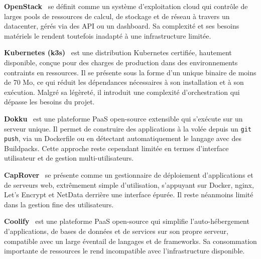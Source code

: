 \documentclass{rapportClass} %
\begin{document}
\textbf{OpenStack}~\cite{openstack} se définit comme un système d'exploitation
cloud qui contrôle de larges pools de ressources de calcul, de stockage et de
réseau à travers un datacenter, gérés via des API ou un dashboard. %
Sa complexité et ses besoins matériels le rendent toutefois inadapté à une
infrastructure limitée.
\smallskip

\textbf{Kubernetes (k3s)}~\cite{k3s} est une distribution Kubernetes certifiée,
hautement disponible, conçue pour des charges de production dans des environnements
contraints en ressources. Il se présente sous la forme d'un unique binaire de moins de 70 Mo,
ce qui réduit les dépendances nécessaires à son installation et à son exécution.
Malgré sa légèreté, il introduit une complexité d'orchestration qui dépasse les
besoins du projet.
\smallskip

\textbf{Dokku}~\cite{dokku} est une plateforme PaaS open-source extensible
qui s'exécute sur un serveur unique. Il permet de construire des applications
à la volée depuis un \texttt{git push}, via un Dockerfile ou en détectant
automatiquement le langage avec des Buildpacks. Cette approche
reste cependant limitée en termes d'interface utilisateur et de gestion
multi-utilisateurs.
\smallskip

\textbf{CapRover}~\cite{caprover} se présente comme un gestionnaire de déploiement
d'applications et de serveurs web, extrêmement simple d'utilisation, s'appuyant
sur Docker, nginx, Let's Encrypt et NetData derrière une interface
épurée. Il reste néanmoins limité dans la gestion fine des
utilisateurs.
\smallskip

\textbf{Coolify}~\cite{coolify} est une plateforme PaaS open-source qui simplifie
l'auto-hébergement d'applications, de bases de données et de services sur son
propre serveur, compatible avec un large éventail de langages et de
frameworks. Sa consommation importante de ressources le rend
incompatible avec l'infrastructure disponible.
\end{document}
